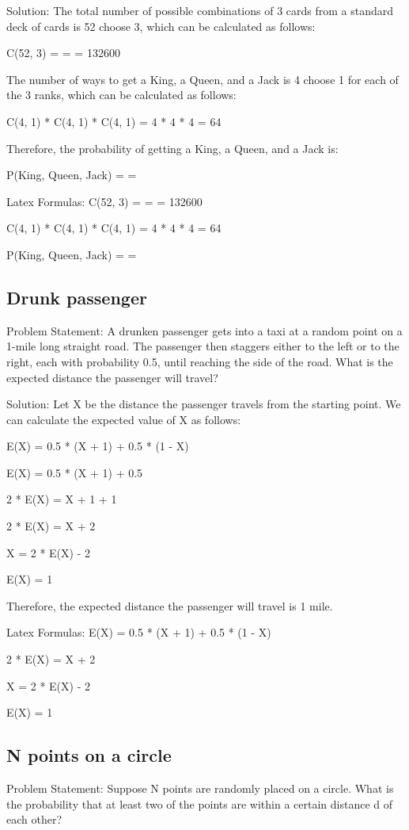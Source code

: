 \documentclass[12pt, a4paper, oneside]{article}
\begin{document}
Solution:
The total number of possible combinations of 3 cards from a standard deck of cards is 52 choose 3, which can be calculated as follows:

C(52, 3) =  =  = 132600

The number of ways to get a King, a Queen, and a Jack is 4 choose 1 for each of the 3 ranks, which can be calculated as follows:

C(4, 1) * C(4, 1) * C(4, 1) = 4 * 4 * 4 = 64

Therefore, the probability of getting a King, a Queen, and a Jack is:

P(King, Queen, Jack) =  = 

Latex Formulas:
C(52, 3) =  =  = 132600

C(4, 1) * C(4, 1) * C(4, 1) = 4 * 4 * 4 = 64

P(King, Queen, Jack) =  = 
\subsection{ Drunk passenger  }
Problem Statement:
A drunken passenger gets into a taxi at a random point on a 1-mile long straight road. The passenger then staggers either to the left or to the right, each with probability 0.5, until reaching the side of the road.
What is the expected distance the passenger will travel?

Solution:
Let X be the distance the passenger travels from the starting point. We can calculate the expected value of X as follows:

E(X) = 0.5 * (X + 1) + 0.5 * (1 - X)

E(X) = 0.5 * (X + 1) + 0.5

2 * E(X) = X + 1 + 1

2 * E(X) = X + 2

X = 2 * E(X) - 2

E(X) = 1

Therefore, the expected distance the passenger will travel is 1 mile.

Latex Formulas:
E(X) = 0.5 * (X + 1) + 0.5 * (1 - X)

2 * E(X) = X + 2

X = 2 * E(X) - 2

E(X) = 1
\subsection{ N points on a circle }
Problem Statement:
Suppose N points are randomly placed on a circle. What is the probability that at least two of the points are within a certain distance d of each other?
\end{document}
